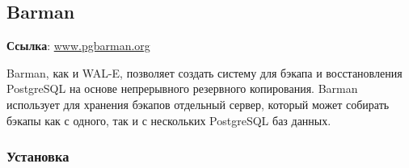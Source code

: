 \subsection{Barman}
\textbf{Ссылка}: \href{http://www.pgbarman.org/}{www.pgbarman.org}

Barman, как и WAL-E, позволяет создать систему для бэкапа и восстановления PostgreSQL на основе непрерывного резервного копирования. Barman использует для хранения бэкапов отдельный сервер, который может собирать бэкапы как с одного, так и с нескольких PostgreSQL баз данных.

\subsubsection{Установка}



